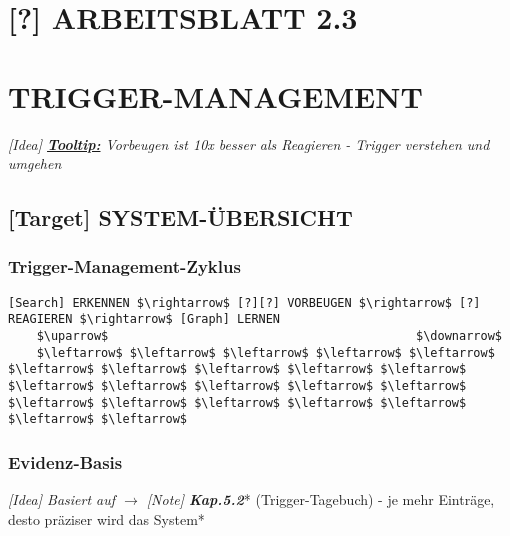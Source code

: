 \hypertarget{arbeitsblatt-2.3}{%
\section{\texorpdfstring{[?] \textbf{ARBEITSBLATT 2.3} }{[?] ARBEITSBLATT 2.3 }}\label{arbeitsblatt-2.3}}

\hypertarget{trigger-management}{%
\section{\texorpdfstring{\textbf{TRIGGER-MANAGEMENT}}{TRIGGER-MANAGEMENT}}\label{trigger-management}}

\emph{[Idea] \textbf{\ul{Tooltip:}} Vorbeugen ist 10x besser als Reagieren - Trigger verstehen und umgehen}

\hypertarget{system-uxfcbersicht}{%
\subsection{\texorpdfstring{[Target] \textbf{SYSTEM-ÜBERSICHT}}{[Target] SYSTEM-ÜBERSICHT}}\label{system-uxfcbersicht}}

\hypertarget{trigger-management-zyklus}{%
\subsubsection{\texorpdfstring{\textbf{Trigger-Management-Zyklus}}{Trigger-Management-Zyklus}}\label{trigger-management-zyklus}}

\begin{verbatim}
[Search] ERKENNEN $\rightarrow$ [?][?] VORBEUGEN $\rightarrow$ [?] REAGIEREN $\rightarrow$ [Graph] LERNEN
    $\uparrow$                                           $\downarrow$
    $\leftarrow$ $\leftarrow$ $\leftarrow$ $\leftarrow$ $\leftarrow$ $\leftarrow$ $\leftarrow$ $\leftarrow$ $\leftarrow$ $\leftarrow$ $\leftarrow$ $\leftarrow$ $\leftarrow$ $\leftarrow$ $\leftarrow$ $\leftarrow$ $\leftarrow$ $\leftarrow$ $\leftarrow$ $\leftarrow$ $\leftarrow$ $\leftarrow$
\end{verbatim}

\hypertarget{evidenz-basis}{%
\subsubsection{\texorpdfstring{\textbf{Evidenz-Basis}}{Evidenz-Basis}}\label{evidenz-basis}}

\emph{[Idea] Basiert auf $\rightarrow$ [Note] \textbf{Kap.5.2}}* (Trigger-Tagebuch) - je mehr Einträge, desto präziser wird das System*

